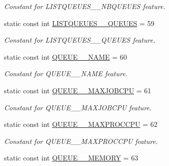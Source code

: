 \begin{DoxyCompactItemize}
\begin{DoxyCompactList}\small\item\em Constant for LISTQUEUES\_\-\_\-NBQUEUES feature. \item\end{DoxyCompactList}\item 
\hypertarget{classTMS__Data_1_1TMS__DataPackage_adf2629cc2167848e4678afc758f8ff2e}{
static const int \hyperlink{classTMS__Data_1_1TMS__DataPackage_adf2629cc2167848e4678afc758f8ff2e}{LISTQUEUES\_\-\_\-QUEUES} = 59}
\label{classTMS__Data_1_1TMS__DataPackage_adf2629cc2167848e4678afc758f8ff2e}

\begin{DoxyCompactList}\small\item\em Constant for LISTQUEUES\_\-\_\-QUEUES feature. \item\end{DoxyCompactList}\item 
\hypertarget{classTMS__Data_1_1TMS__DataPackage_a602208edf42b7f1ad7263a71990cf439}{
static const int \hyperlink{classTMS__Data_1_1TMS__DataPackage_a602208edf42b7f1ad7263a71990cf439}{QUEUE\_\-\_\-NAME} = 60}
\label{classTMS__Data_1_1TMS__DataPackage_a602208edf42b7f1ad7263a71990cf439}

\begin{DoxyCompactList}\small\item\em Constant for QUEUE\_\-\_\-NAME feature. \item\end{DoxyCompactList}\item 
\hypertarget{classTMS__Data_1_1TMS__DataPackage_a9a8f64f6df86bb42c26e8313cf028e0d}{
static const int \hyperlink{classTMS__Data_1_1TMS__DataPackage_a9a8f64f6df86bb42c26e8313cf028e0d}{QUEUE\_\-\_\-MAXJOBCPU} = 61}
\label{classTMS__Data_1_1TMS__DataPackage_a9a8f64f6df86bb42c26e8313cf028e0d}

\begin{DoxyCompactList}\small\item\em Constant for QUEUE\_\-\_\-MAXJOBCPU feature. \item\end{DoxyCompactList}\item 
\hypertarget{classTMS__Data_1_1TMS__DataPackage_a2ba18d5db1b9d6f7948f101aa832a585}{
static const int \hyperlink{classTMS__Data_1_1TMS__DataPackage_a2ba18d5db1b9d6f7948f101aa832a585}{QUEUE\_\-\_\-MAXPROCCPU} = 62}
\label{classTMS__Data_1_1TMS__DataPackage_a2ba18d5db1b9d6f7948f101aa832a585}

\begin{DoxyCompactList}\small\item\em Constant for QUEUE\_\-\_\-MAXPROCCPU feature. \item\end{DoxyCompactList}\item 
\hypertarget{classTMS__Data_1_1TMS__DataPackage_ae151437b8cf01f711a33d7a6b665dc4a}{
static const int \hyperlink{classTMS__Data_1_1TMS__DataPackage_ae151437b8cf01f711a33d7a6b665dc4a}{QUEUE\_\-\_\-MEMORY} = 63}
\label{classTMS__Data_1_1TMS__DataPackage_ae151437b8cf01f711a33d7a6b665dc4a}


\end{DoxyCompactItemize}
